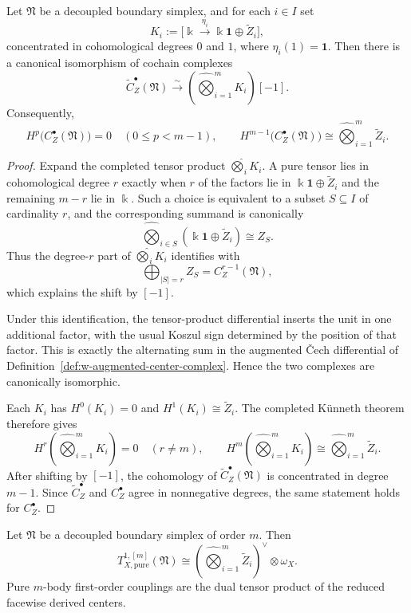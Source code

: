 \begin{theorem}
\label{thm:w-augmented-center-tensor-model}
Let $\mathfrak N$ be a decoupled boundary simplex, and for each $i\in I$ set
\[
K_i:=\bigl[\Bbbk\xrightarrow{\eta_i} \Bbbk\mathbf{1}\oplus \widetilde Z_i\bigr],
\]
concentrated in cohomological degrees $0$ and $1$, where $\eta_i(1)=\mathbf{1}$.
Then there is a canonical isomorphism of cochain complexes
\[
\widetilde C_Z^\bullet(\mathfrak N)
\xrightarrow{\sim}
\left(\widehat\bigotimes_{i=1}^m K_i\right)[-1].
\]
Consequently,
\[
H^p\bigl(C_Z^\bullet(\mathfrak N)\bigr)=0
\quad (0\le p<m-1),
\qquad
H^{m-1}\bigl(C_Z^\bullet(\mathfrak N)\bigr)
\cong
\widehat\bigotimes_{i=1}^m \widetilde Z_i.
\]
\end{theorem}

\begin{proof}
Expand the completed tensor product $\widehat\bigotimes_i K_i$. A pure tensor lies in cohomological
degree $r$ exactly when $r$ of the factors lie in $\Bbbk\mathbf{1}\oplus \widetilde Z_i$ and the remaining
$m-r$ lie in $\Bbbk$. Such a choice is equivalent to a subset $S\subseteq I$ of cardinality $r$, and the
corresponding summand is canonically
\[
\widehat\bigotimes_{i\in S}(\Bbbk\mathbf{1}\oplus \widetilde Z_i)
\cong Z_S.
\]
Thus the degree-$r$ part of $\widehat\bigotimes_i K_i$ identifies with
\[
\bigoplus_{|S|=r} Z_S = C_Z^{r-1}(\mathfrak N),
\]
which explains the shift by $[-1]$.

Under this identification, the tensor-product differential inserts the unit in one additional factor, with
the usual Koszul sign determined by the position of that factor. This is exactly the alternating sum in the
augmented \v{C}ech differential of Definition~\ref{def:w-augmented-center-complex}. Hence the two complexes
are canonically isomorphic.

Each $K_i$ has $H^0(K_i)=0$ and $H^1(K_i)\cong \widetilde Z_i$. The completed K\"unneth theorem therefore gives
\[
H^r\left(\widehat\bigotimes_{i=1}^m K_i\right)=0\quad (r\neq m),
\qquad
H^m\left(\widehat\bigotimes_{i=1}^m K_i\right)
\cong
\widehat\bigotimes_{i=1}^m \widetilde Z_i.
\]
After shifting by $[-1]$, the cohomology of $\widetilde C_Z^\bullet(\mathfrak N)$ is concentrated in degree $m-1$.
Since $\widetilde C_Z^\bullet$ and $C_Z^\bullet$ agree in nonnegative degrees, the same statement holds for
$C_Z^\bullet$.
\end{proof}

\begin{corollary}
\label{cor:w-pure-mbody-coupling-theorem}
Let $\mathfrak N$ be a decoupled boundary simplex of order $m$. Then
\[
T^{1,[m]}_{X,\mathrm{pure}}(\mathfrak N)
\cong
\left(\widehat\bigotimes_{i=1}^m \widetilde Z_i\right)^\vee\otimes \omega_X.
\]
Pure $m$-body first-order couplings are the dual tensor product of the reduced
facewise derived centers.
\end{corollary}

